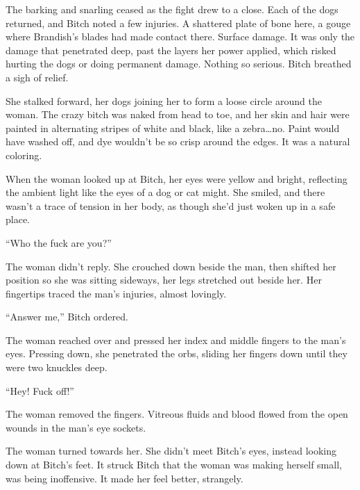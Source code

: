 The barking and snarling ceased as the fight drew to a close.  Each of the dogs returned, and Bitch noted a few injuries.  A shattered plate of bone here, a gouge where Brandish's blades had made contact there.  Surface damage.  It was only the damage that penetrated deep, past the layers her power applied, which risked hurting the dogs or doing permanent damage.  Nothing so serious.  Bitch breathed a sigh of relief.



She stalked forward, her dogs joining her to form a loose circle around the woman.  The crazy bitch was naked from head to toe, and her skin and hair were painted in alternating stripes of white and black, like a zebra\ldots no.  Paint would have washed off, and dye wouldn't be so crisp around the edges.  It was a natural coloring.



When the woman looked up at Bitch, her eyes were yellow and bright, reflecting the ambient light like the eyes of a dog or cat might.  She smiled, and there wasn't a trace of tension in her body, as though she'd just woken up in a safe place.



``Who the fuck are you?''



The woman didn't reply.  She crouched down beside the man, then shifted her position so she was sitting sideways, her legs stretched out beside her.  Her fingertips traced the man's injuries, almost lovingly.



``Answer me,'' Bitch ordered.



The woman reached over and pressed her index and middle fingers to the man's eyes.  Pressing down, she penetrated the orbs, sliding her fingers down until they were two knuckles deep.



``Hey!  Fuck off!''



The woman removed the fingers.  Vitreous fluids and blood flowed from the open wounds in the man's eye sockets.



The woman turned towards her.  She didn't meet Bitch's eyes, instead looking down at Bitch's feet.  It struck Bitch that the woman was making herself small, was being inoffensive.  It made her feel better, strangely.



